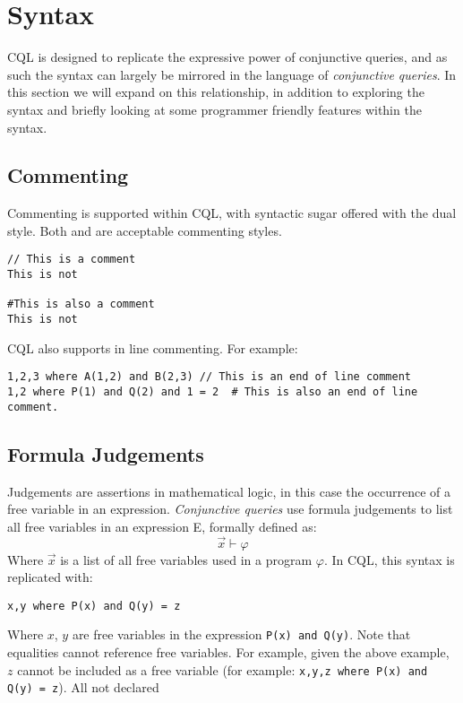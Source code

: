 \section{Syntax}
\begin{normalsize}
CQL is designed to replicate the expressive power of conjunctive queries, and as such the syntax can largely be mirrored in the language of \textit{conjunctive queries}. In this section we will expand on this relationship, in addition to exploring the syntax and briefly looking at some programmer friendly features within the syntax.

\subsection{Commenting}

Commenting is supported within CQL, with syntactic sugar offered with the dual style. Both \codeword{//} and \codeword{#} are acceptable commenting styles.
\begin{lstlisting}[style=framed]
// This is a comment
This is not

#This is also a comment
This is not
\end{lstlisting}
CQL also supports in line commenting. For example:
\begin{lstlisting}[style=framed]
1,2,3 where A(1,2) and B(2,3) // This is an end of line comment
1,2 where P(1) and Q(2) and 1 = 2  # This is also an end of line comment.
\end{lstlisting}


\subsection{Formula Judgements}
Judgements are assertions in mathematical logic, in this case the occurrence of a free variable in an expression. \textit{Conjunctive queries} use formula judgements to list all free variables in an expression E, formally defined as:
$$ \overrightarrow{x} \vdash \varphi $$
Where $\overrightarrow{x}$ is a list of all free variables used in a program $\varphi$.  In CQL, this syntax is replicated with:
\begin{lstlisting}[style=framed]
x,y where P(x) and Q(y) = z
\end{lstlisting}
Where $x$, $y$ are free variables in the expression \lstinline!P(x) and Q(y)!. Note that equalities cannot reference free variables. For example, given the above example, $z$ cannot be included as a free variable (for example: \lstinline!x,y,z where P(x) and Q(y) = z!). All not declared 
\end{normalsize}


